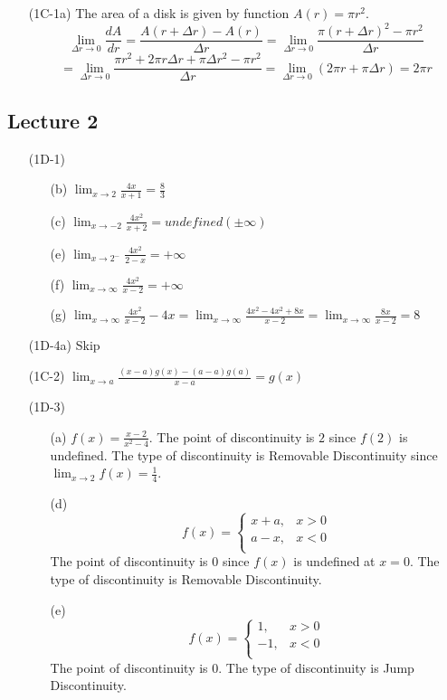 \documentclass{article}
\begin{document}
\begin{itemize}
\begin{itemize}
\end{itemize}

\item[(1C-1a)] The area of a disk is given by function $A(r) = \pi r^2$.
\[ \lim_{\Delta r \to 0} \frac{dA}{dr} = \frac{A(r+\Delta r) - A(r)}{\Delta r} = \lim_{\Delta r \to 0} \frac{\pi(r+\Delta r)^2 - \pi r^2}{\Delta r} \]
\[ = \lim_{\Delta r \to 0} \frac{\pi r^2 + 2 \pi r \Delta r + \pi \Delta r^2 - \pi r^2}{\Delta r} = \lim_{\Delta r \to 0} \left( 2 \pi r + \pi \Delta r \right) = 2\pi r  \]
\end{itemize}

\subsection{Lecture 2}

\begin{itemize}
\item[(1D-1)]
\begin{itemize}
    \item[(b)] $\lim_{x \to 2} \frac{4x}{x+1} = \frac{8}{3}$ 
    \item[(c)] $\lim_{x \to -2} \frac{4x^2}{x+2} = undefined (\pm \infty)$
    \item[(e)] $\lim_{x \to 2^-} \frac{4x^2}{2-x} = +\infty$
    \item[(f)] $\lim_{x \to \infty} \frac{4x^2}{x-2} = +\infty$
    \item[(g)] $\lim_{x \to \infty} \frac{4x^2}{x-2} - 4x = \lim_{x \to \infty} \frac{4x^2-4x^2+8x}{x-2} = \lim_{x \to \infty} \frac{8x}{x-2} = 8$  
\end{itemize}
\item[(1D-4a)] Skip
\item[(1C-2)] $\lim_{x \to a} \frac{(x-a)g(x) - (a - a)g(a)}{x-a} = g(x)$
\item[(1D-3)]
\begin{itemize}
    \item[(a)] $f(x) = \frac{x-2}{x^2-4}$. The point of discontinuity is $2$ since $f(2)$ is undefined. The type of discontinuity is Removable Discontinuity since $\lim_{x \to 2} f(x) = \frac{1}{4}$.
    \item[(d)] 
    \[f(x)=
    \left\{
      \begin{array}{ll}
      x+a, & x > 0 \\
      a-x, & x < 0 \\
      \end{array} 
      \right.
    \]
    The point of discontinuity is $0$ since $f(x)$ is undefined at $x = 0$. The type of discontinuity is Removable Discontinuity. 
    \item[(e)]
    \[f(x)=
    \left\{
      \begin{array}{ll}
      1, & x > 0 \\
      -1, & x < 0 \\
      \end{array} 
      \right.
    \]
    The point of discontinuity is $0$. The type of discontinuity is Jump Discontinuity.    
\end{itemize}


\end{itemize}
\end{document}
